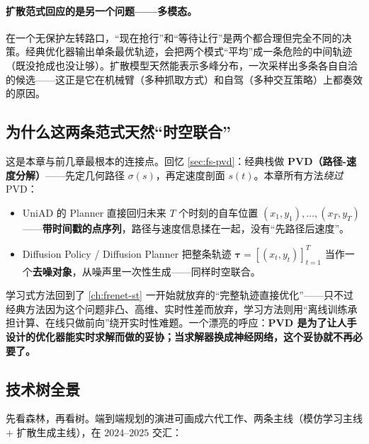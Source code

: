 \paragraph{扩散范式回应的是另一个问题——多模态。}
在一个无保护左转路口，“现在抢行”和“等待让行”是两个都合理但完全不同的决策。经典优化器输出单条最优轨迹，会把两个模式“平均”成一条危险的中间轨迹（既没抢成也没让够）。扩散模型天然能表示多峰分布，一次采样出多条各自自洽的候选——这正是它在机械臂（多种抓取方式）和自驾（多种交互策略）上都奏效的原因。

\subsection{为什么这两条范式天然“时空联合”}
\label{sec:de-spatiotemporal}

这是本章与前几章最根本的连接点。回忆 \cref{sec:fs-pvd}：经典栈做 \textbf{PVD（路径-速度分解）}——先定几何路径 $\sigma(s)$，再定速度剖面 $s(t)$。本章所有方法\emph{绕过} PVD：

\begin{itemize}
  \item UniAD 的 Planner 直接回归未来 $T$ 个时刻的自车位置 $(x_1,y_1),\dots,(x_T,y_T)$——\textbf{带时间戳的点序列}，路径与速度信息揉在一起，没有“先路径后速度”。
  \item Diffusion Policy / Diffusion Planner 把整条轨迹 $\boldsymbol{\tau}=[(x_t,y_t)]_{t=1}^{T}$ 当作一个\textbf{去噪对象}，从噪声里一次性生成——同样时空联合。
\end{itemize}

\begin{insight}
学习式方法回到了 \cref{ch:frenet-st} 一开始就放弃的“完整轨迹直接优化”——只不过经典方法因为这个问题非凸、高维、实时性差而放弃，学习方法则用“离线训练承担计算、在线只做前向”绕开实时性难题。一个漂亮的呼应：\textbf{PVD 是为了让人手设计的优化器能实时求解而做的妥协；当求解器换成神经网络，这个妥协就不再必要了。}
\end{insight}

\subsection{技术树全景}
\label{sec:de-techtree}

先看森林，再看树。端到端规划的演进可画成六代工作、两条主线（模仿学习主线 $+$ 扩散生成主线），在 $2024$--$2025$ 交汇：

